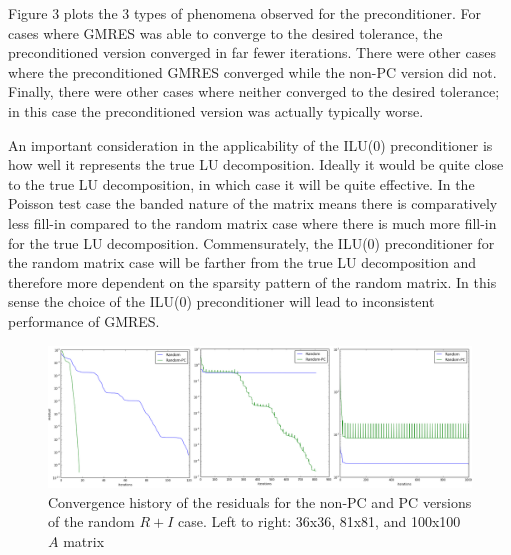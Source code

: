 \documentclass[letterpaper,10pt]{article}
\begin{document}
 Figure 3 plots the 3 types of phenomena observed for the preconditioner. For cases where GMRES was able to converge to the desired tolerance, the preconditioned version converged in far fewer iterations. There were other cases where the preconditioned GMRES converged while the non-PC version did not. Finally, there were other cases where neither converged to the desired tolerance; in this case the preconditioned version was actually typically worse.
 
 An important consideration in the applicability of the ILU(0) preconditioner is how well it represents the true LU decomposition. Ideally it would be quite close to the true LU decomposition, in which case it will be quite effective. In the Poisson test case the banded nature of the matrix means there is comparatively less fill-in compared to the random matrix case where there is much more fill-in for the true LU decomposition. Commensurately, the ILU(0) preconditioner for the random matrix case will be farther from the true LU decomposition and therefore more dependent on the sparsity pattern of the random matrix. In this sense the choice of the ILU(0) preconditioner will lead to inconsistent performance of GMRES.
\begin{figure}[!htb]
\hskip -0.6in
\includegraphics[width=1.2\textwidth]{RandomABC.PNG}
\caption{Convergence history of the residuals for the non-PC and PC versions of the random $R+I$ case. Left to right: 36x36, 81x81, and 100x100 $A$ matrix}
\end{figure}
\end{document}
